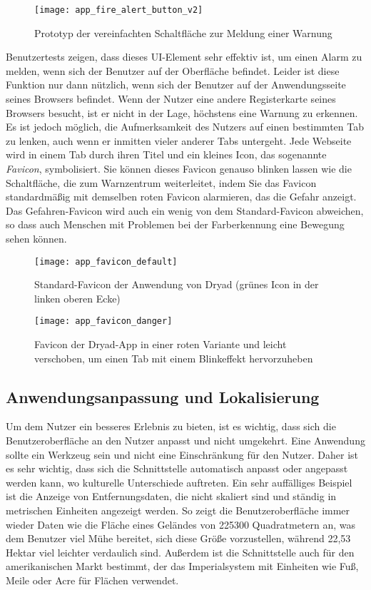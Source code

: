 \begin{figure}[H]
  \centering
  \texttt{[image: app\_fire\_alert\_button\_v2]}
  \caption{Prototyp der vereinfachten Schaltfläche zur Meldung einer Warnung}
  \label{fig:app_fire_alert_button_v2}
\end{figure}

Benutzertests zeigen, dass dieses \ac{UI}-Element sehr effektiv ist, um einen Alarm zu melden, wenn sich der Benutzer auf der Oberfläche befindet.
Leider ist diese Funktion nur dann nützlich, wenn sich der Benutzer auf der Anwendungsseite seines Browsers befindet.
Wenn der Nutzer eine andere Registerkarte seines Browsers besucht, ist er nicht in der Lage, höchstens eine Warnung zu erkennen.
Es ist jedoch möglich, die Aufmerksamkeit des Nutzers auf einen bestimmten Tab zu lenken, auch wenn er inmitten vieler anderer Tabs untergeht.
Jede Webseite wird in einem Tab durch ihren Titel und ein kleines Icon, das sogenannte \textit{Favicon}, symbolisiert.
Sie können dieses Favicon genauso blinken lassen wie die Schaltfläche, die zum Warnzentrum weiterleitet, indem Sie das Favicon standardmäßig mit demselben roten Favicon alarmieren, das die Gefahr anzeigt.
Das Gefahren-Favicon wird auch ein wenig von dem Standard-Favicon abweichen, so dass auch Menschen mit Problemen bei der Farberkennung eine Bewegung sehen können.

\begin{figure}[H]
  \centering
  \texttt{[image: app\_favicon\_default]}
  \caption{Standard-Favicon der Anwendung von Dryad (grünes Icon in der linken oberen Ecke)}
  \label{fig:app_favicon_default}
\end{figure}

\begin{figure}[H]
  \centering
  \texttt{[image: app\_favicon\_danger]}
  \caption{Favicon der Dryad-App in einer roten Variante und leicht verschoben, um einen Tab mit einem Blinkeffekt hervorzuheben}
  \label{fig:app_favicon_danger}
\end{figure}

\subsection{Anwendungsanpassung und Lokalisierung}
Um dem Nutzer ein besseres Erlebnis zu bieten, ist es wichtig, dass sich die Benutzeroberfläche an den Nutzer anpasst und nicht umgekehrt.
Eine Anwendung sollte ein Werkzeug sein und nicht eine Einschränkung für den Nutzer.
Daher ist es sehr wichtig, dass sich die Schnittstelle automatisch anpasst oder angepasst werden kann, wo kulturelle Unterschiede auftreten.
Ein sehr auffälliges Beispiel ist die Anzeige von Entfernungsdaten, die nicht skaliert sind und ständig in metrischen Einheiten angezeigt werden.
So zeigt die Benutzeroberfläche immer wieder Daten wie die Fläche eines Geländes von 225300 Quadratmetern an, was dem Benutzer viel Mühe bereitet, sich diese Größe vorzustellen, während 22,53 Hektar viel leichter verdaulich sind.
Außerdem ist die Schnittstelle auch für den amerikanischen Markt bestimmt, der das Imperialsystem mit Einheiten wie Fuß, Meile oder Acre für Flächen verwendet.

